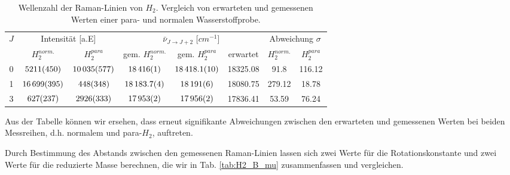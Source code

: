 \documentclass[11pt]{article}
\begin{document}
\begin{table}[!htbp]
 \begin{center}
  \caption{\small Wellenzahl der Raman-Linien von $H_2$. Vergleich von erwarteten und gemessenen Werten einer para- und normalen Wasserstoffprobe.}
  \label{tab:H2}
  \renewcommand{\arraystretch}{1.3} %
  \begin{tabular}{|c|c|c|c|c|c|c|c|}
  \hline
\multirow{2}{*}{$J$}&\multicolumn{2}{c|}{Intensität [a.E]}& \multicolumn{3}{c|}{$\bar{\nu}_{J\to J+2}$ [$\unit{cm^{-1}}$]} & \multicolumn{2}{c|}{ Abweichung $\sigma$} \\ \cline{2-8} %
 					 &$H_2^{norm.}$	&	$H_2^{para}$ & gem. $H_2^{norm.}$ & gem. $H_2^{para}$& erwartet &  $H_2^{norm.}$	&	$H_2^{para}$\\ 
  \hline
	\hline 
0 &	$\num{5211\pm450}$ 	&	$\num{10035\pm577}$	&	$\num{18416	\pm 1}$	& $\num{18418.1\pm 1}$	& 18325.08	& 91.8	& 116.12 \\ 
1 & 	$\num{16699\pm395}$	&	$\num{448\pm348}$	&	$\num{18183.7\pm0.4}$& $\num{18191\pm6}$	& 18080.75	& 279.12	& 18.78 \\ 
3 &	$\num{627\pm237}$	&	$\num{2926\pm333}$	&	$\num{17953\pm2}$	& $\num{17956\pm2}$	& 17836.41	& 53.59	& 76.24\\ 
	\hline
  \end{tabular}
  \renewcommand{\arraystretch}{1}
 \end{center}
\end{table}

Aus der Tabelle können wir ersehen, dass erneut signifikante Abweichungen zwischen den erwarteten und gemessenen Werten bei beiden Messreihen, d.h. normalem und para-$H_2$, auftreten.

Durch Bestimmung des Abstands zwischen den gemessenen Raman-Linien lassen sich zwei Werte für die Rotationskonstante und zwei Werte für die reduzierte Masse berechnen, die wir in Tab. \ref{tab:H2_B_mu} zusammenfassen und vergleichen.
\end{document}
